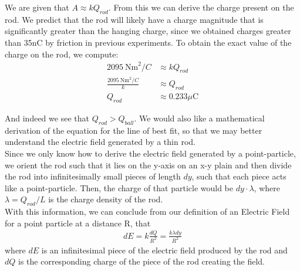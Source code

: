 \documentclass[oneside,12pt]{amsart}
\begin{document}
	\indent We are given that $A\approx kQ_{rod}$. From this we can derive the charge present on the rod. We predict that the rod will likely have a charge magnitude that is significantly greater than the hanging charge, since we obtained charges greater than 35nC by friction in previous experiments. To obtain the exact value of the charge on the rod, we compute:\\
	\begin{align*}
	2095\:\text{Nm}^2/C &\approx kQ_{rod}\\
	\frac{2095\:\text{Nm}^2/C}{k}&\approx Q_{rod}\\
	Q_{rod}&\approx 0.233\mu\text{C}
	\end{align*}
	
	\indent And indeed we see that $Q_{rod}>Q_{ball}$. We would also like a mathematical derivation of the equation for the line of best fit, so that we may better understand the electric field generated by a thin rod.\\
	
	\indent Since we only know how to derive the electric field generated by a point-particle, we orient the rod such that it lies on the y-axis on an x-y plain and then divide the rod into infinitesimally small pieces of length $dy$, such that each piece acts like a point-particle. Then, the charge of that particle would be $dy\cdot \lambda$, where $\lambda = Q_{rod}/L$ is the charge density of the rod.\\
	
	\indent With this information, we can conclude from our definition of an Electric Field for a point particle at a distance R, that 
	\begin{align*}
	 dE = k\frac{dQ}{R^2} = \frac{k\lambda dy}{R^2}
	\end{align*}
	where $dE$ is an infinitesimal piece of the electric field produced by the rod and $dQ$ is the corresponding charge of the piece of the rod creating the field.\\
	
\end{document}
